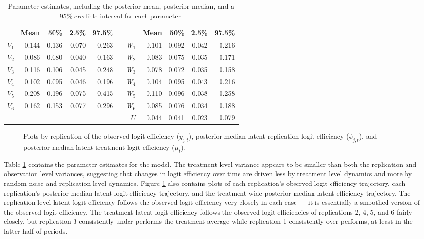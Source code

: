 \documentclass[graybox]{svmult}
\begin{document}
\begin{table}[ht]
\centering
\begin{tabular}{rrrrrrrrrrr}
  \hline
        & Mean  & 50\%  & 2.5\% & 97.5\% &&& Mean & 50\% & 2.5\% & 97.5\% \\  
  \hline
  $V_1$ & 0.144 & 0.136 & 0.070 & 0.263 && $W_1$ & 0.101 & 0.092 & 0.042 & 0.216 \\ 
  $V_2$ & 0.086 & 0.080 & 0.040 & 0.163 && $W_2$ & 0.083 & 0.075 & 0.035 & 0.171 \\ 
  $V_3$ & 0.116 & 0.106 & 0.045 & 0.248 && $W_3$ & 0.078 & 0.072 & 0.035 & 0.158 \\ 
  $V_4$ & 0.102 & 0.095 & 0.046 & 0.196 && $W_4$ & 0.104 & 0.095 & 0.043 & 0.216 \\  
  $V_5$ & 0.208 & 0.196 & 0.075 & 0.415 && $W_5$ & 0.110 & 0.096 & 0.038 & 0.258 \\ 
  $V_6$ & 0.162 & 0.153 & 0.077 & 0.296 && $W_6$ & 0.085 & 0.076 & 0.034 & 0.188 \\ 
  &&&&&& $U$ & 0.044 & 0.041 & 0.023 & 0.079 \\  
   \hline
\end{tabular}
\caption{Parameter estimates, including the posterior mean, posterior median, and a 95\% credible interval for each parameter.}
\label{tab:parests}
\end{table}

\begin{figure}[h]
\begin{center}
\end{center}
\caption{Plots by replication of the observed logit efficiency ($y_{j,t}$), posterior median latent replication logit efficiency ($\phi_{j,t}$), and posterior median latent treatment logit efficiency ($\mu_t$).}
\label{fig:phiplot}
\end{figure}

Table \ref{tab:parests} contains the parameter estimates for the model. The treatment level variance appears to be smaller than both the replication and observation level variances, suggesting that changes in logit efficiency over time are driven less by treatment level dynamics and more by random noise and replication level dynamics. Figure \ref{fig:phiplot} also contains plots of each replication's observed logit efficiency trajectory, each replication's posterior median latent logit efficiency trajectory, and the treatment wide posterior median latent efficiency trajectory. The replication level latent logit efficiency follows the observed logit efficiency very closely in each case --- it is essentially a smoothed version of the observed logit efficiency. The treatment latent logit efficiency follows the observed logit efficiencies of replications 2, 4, 5, and 6 fairly closely, but replication 3 consistently under performs the treatment average while replication 1 consistently over performs, at least in the latter half of periods.
\end{document}
